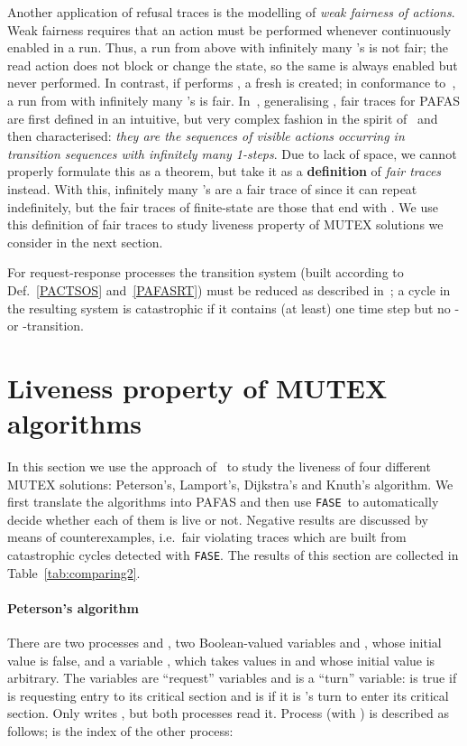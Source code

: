 \documentclass[copyright,creativecommons]{eptcs}
\newcommand{\fase}{\texttt{FASE}}
\begin{document}
Another application of refusal traces is the modelling of {\it weak
fairness of actions}. Weak fairness requires that an action must be
performed whenever continuously enabled in a run. Thus, a run from 
above with infinitely many 's is not fair; the read action does not
block  or change the state, so the same  is  always enabled but never
performed. In contrast, if  performs , a fresh  is created; in
conformance to~\cite{CostaS84}, a run from  with infinitely many 's
is fair. In~\cite{CDV08tr}, generalising \cite{CDV06}, fair traces for
PAFAS are first defined in an intuitive, but very complex fashion in
the spirit of~\cite{CostaS84,CostaS87} and then characterised: {\em they
are the sequences of visible actions occurring in transition sequences with
infinitely many 1-steps}. 
Due to lack of space, we cannot properly formulate this as a theorem, but
take it as a {\bf definition} of \emph{fair traces} instead. With this,
infinitely many 's are a fair trace of  since it can repeat 
indefinitely, but the fair traces of finite-state  are those that end
with . We use this definition of fair traces to study liveness property
of MUTEX solutions we consider in the next section. 


For request-response processes the transition system (built according to
Def.~\ref{PACTSOS} and~\ref{PAFASRT}) must be reduced as described
in~\cite{CV05}; a cycle in the resulting system is catastrophic if it
contains (at least) one time step but no - or -transition.

\section{Liveness property of MUTEX algorithms}\label{algos}
In this section we use the approach of~\cite{CDV08tr} to study the liveness
of four different MUTEX solutions: Peterson's, Lamport's, Dijkstra's and 
Knuth's algorithm. We first translate the algorithms into PAFAS and
then use \fase\ to automatically decide whether each of them is live or
not. Negative results are discussed by means of counterexamples, i.e.\ fair
violating traces which are built from catastrophic cycles detected with
\fase. The results of this section are collected in
Table~\ref{tab:comparing2}.

\paragraph{Peterson's algorithm}\label{sec:peterson}
There are two processes  and , two Boolean-valued
variables  and , whose initial value is false, and a variable
, which takes values in  and whose initial value is arbitrary.
The  variables are ``request'' variables and  is a ``turn''
variable:  is true if  is requesting entry to its critical
section and  is  if it is 's turn to enter its critical
section. Only  writes , but both processes read it. Process 
 (with ) is described as follows;   is the index of the
other process:
\end{document}
